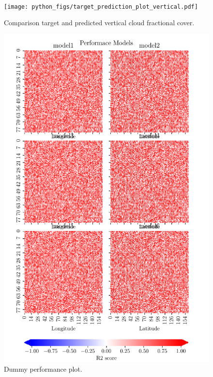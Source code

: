 \begin{figure}[ht]
    \centering
    \texttt{[image: python\_figs/target\_prediction\_plot\_vertical.pdf]}
    \caption{Comparison target and predicted vertical cloud fractional cover.}
    \label{fig:target_predict_vertical}
\end{figure}

\begin{figure}[ht]
    \centering
    \includegraphics{python_figs/dummy_model_performace_plot.pdf}
    \caption{Dummy performance plot.}
    \label{fig:dummy_performace_plot}
\end{figure}


